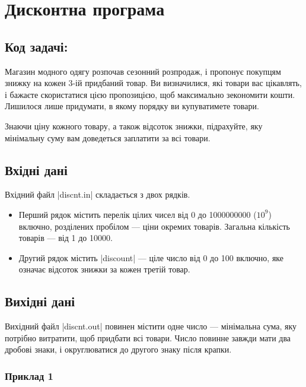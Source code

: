 \documentclass[12pt,a4paper]{article}
\begin{document}
\section*{Дисконтна програма \hfill {}}


\subsection*{Код задачі: }

Магазин модного одягу розпочав сезонний розпродаж, і пропонує покупцям знижку на кожен 3-ій придбаний товар.
Ви визначилися, які товари вас цікавлять, і бажаєте скористатися цією пропозицією, щоб максимально зекономити кошти.
Лишилося лише придумати, в якому порядку ви купуватимете товари.

Знаючи ціну кожного товару, а також відсоток знижки, підрахуйте, яку мінімальну суму вам доведеться заплатити за всі товари.


\subsection*{Вхідні дані}

Вхідний файл |discnt.in| складається з двох рядків.

\begin{itemize}
    \item Перший рядок містить перелік цілих чисел від 0 до 1000000000 (\(10 ^ 9\)) включно, розділених пробілом --- ціни окремих товарів. Загальна кількість товарів --- від 1 до 10000.
    \item Другий рядок містить |discount| --- ціле число від 0 до 100 включно, яке означає відсоток знижки за кожен третій товар.
\end{itemize}


\subsection*{Вихідні дані}

Вихідний файл |discnt.out| повинен містити одне число --- мінімальна сума, яку потрібно витратити, щоб придбати всі товари. Число повинне завжди мати два дробові знаки, і округлюватися до другого знаку після крапки.


\pagebreak


\subsubsection*{Приклад 1}
\end{document}
